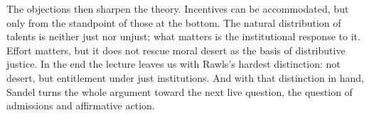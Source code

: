 The objections then sharpen the theory. Incentives can be accommodated, but only from the standpoint of those at the bottom. The natural distribution of talents is neither just nor unjust; what matters is the institutional response to it. Effort matters, but it does not rescue moral desert as the basis of distributive justice. In the end the lecture leaves us with Rawls's hardest distinction: not desert, but entitlement under just institutions. And with that distinction in hand, Sandel turns the whole argument toward the next live question, the question of admissions and affirmative action.